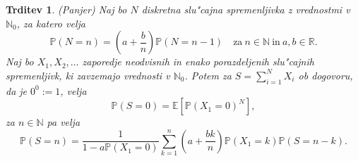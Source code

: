 \documentclass[12pt, a4paper, reqno]{amsart}
\theoremstyle{definition}
\theoremstyle{plain}
\newtheorem{trditev}[definicija]{Trditev}
\newcommand{\R}{\mathbb{R}}
\newcommand{\N}{\mathbb{N}}
\newcommand{\E}{\mathbb{E}}
\newcommand{\Prob}{\mathbb{P}}
\newcommand{\1}{\mathds{1}}
\begin{document}
    \begin{trditev}(Panjer)
        Naj bo $N$ diskretna slu"cajna spremenljivka z vrednostmi v $\N_0$, za katero velja 
        \begin{equation*}
            \Prob(N = n) = \left(a + \frac{b}{n}\right)\Prob\left(N = n-1\right) \quad \text{za} \ n\in\N \ \text{in} \ a, b \in \R.
        \end{equation*}
        Naj bo $X_1, X_2, \dots$ zaporedje neodvisnih in enako porazdeljenih slu"cajnih spremenljivk, ki 
        zavzemajo vrednosti v $\N_0$. Potem za $S = \sum_{i=1}^NX_i$ ob dogovoru, da je $0^0:=1$, velja
        \begin{equation*}
        \Prob\left(S = 0\right) =  \E\left[\Prob\left(X_1 = 0\right)^N\right],
        \end{equation*}
        za $n\in\N$ pa velja
        \begin{equation}
            \Prob\left(S = n\right) = \frac{1}{1 - a\Prob\left(X_1 = 0\right)}\sum_{k = 1}^n\left(a + \frac{bk}{n}\right)\Prob\left(X_1 = k\right)\Prob\left(S = n - k\right).
            \label{eq:PanjerRecursionScheme}
        \end{equation}
        \label{tdr:PanjerRecursionScheme}
    \end{trditev}
\end{document}
